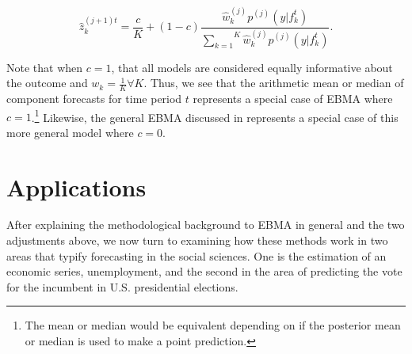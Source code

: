 \documentclass[12pt,fullpage,endnotes]{article}
\begin{document}
\begin{equation}
\hat{z}^{(j+1)t}_{k} = \frac{c}{K} + (1-c)\frac{\hat{w}^{(j)}_k
p^{(j)}(y|f_{k}^{t})}{\overset{K}{\underset{k=1}{\sum}}\hat{w}^{(j)}_kp^{(j)}(y|f_{k}^{t})}.
\end{equation}




Note that when $c=1$, that all models are considered equally
informative about the outcome and $w_k=\frac{1}{K} \forall K$. Thus, we see that the arithmetic mean or
median of component forecasts for time period $t$ represents a special
case of EBMA where $c=1$.\footnote{The mean or median would be
  equivalent depending on if the posterior mean or median is used to
  make a point prediction.}  Likewise, the general EBMA discussed in
\citet{mhw:2012} represents a special case of this more general
model where $c=0$.


\section{Applications}
\label{empirics}
After explaining the methodological background to EBMA in general and the two adjustments above, we now turn to examining how these methods work in two areas that typify forecasting in
the social sciences. One is the estimation of an economic series, unemployment, and the second in the area of predicting the vote for the incumbent in U.S. presidential elections.
\end{document}
